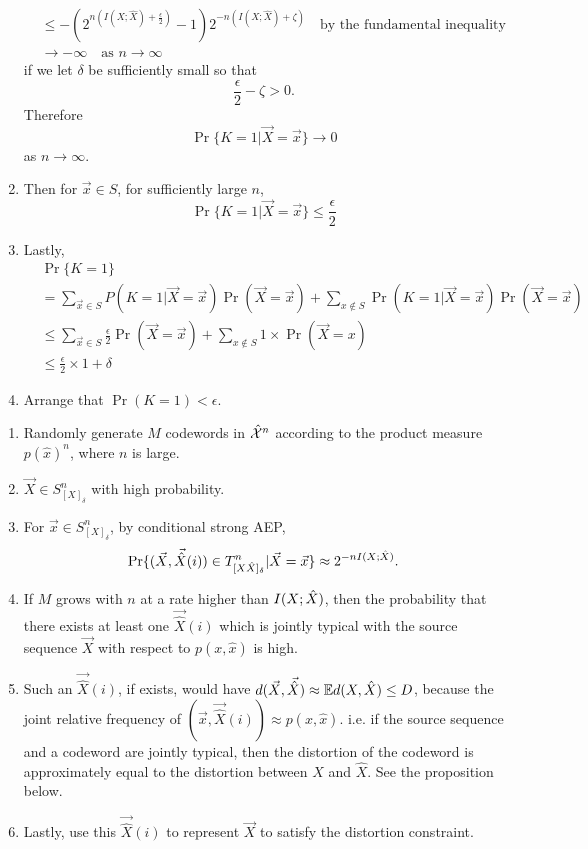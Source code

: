 \documentclass[../main.tex]{subfiles}
\begin{document}
\begin{enumerate}
\begin{align*}
       &\leq -(2^{n(I(X;\hat X)+\frac{\epsilon}{2})}-1)2^{-n(I(X;\hat X)+\zeta)} \quad\text{by the fundamental inequality}
        \\
        &\to -\infty \quad \text{as $n\to\infty$}
\end{align*}
 if we let $\delta$ be sufficiently small so that \[
 \frac{\epsilon}{2}-\zeta > 0.
 \]
 Therefore 
 \[
 \Pr\{K=1|\vec X=\vec x\}\to 0
 \] as $n\to \infty.$
 \item Then for $\vec x\in S$, for sufficiently large $n$, \[
 \Pr\{K=1|\vec X=\vec x\}\leq \frac{\epsilon}{2}
 \]
 \item Lastly,
 \begin{align*}
     &\Pr\{K=1\}\\
     &=\sum_{\vec x\in S}P(K=1|\vec X=\vec x)\Pr(\vec X=\vec x) + \sum_{x\notin S}\Pr(K=1|\vec X=\vec x) \Pr(\vec X=\vec x)\\
     &\leq \sum_{\vec x\in S}\frac{\epsilon}{2}\Pr(\vec X=\vec x) + \sum_{x\notin S}1\times \Pr(\vec X=x)\\
     &\leq \frac{\epsilon}{2}\times 1 + \delta
 \end{align*}
 \item Arrange that $\Pr(K=1) < \epsilon.$
 \end{enumerate}
\begin{enumerate}
    \item Randomly generate $M$ codewords in $\hat {\mathcal{X}}^n$ according to the product measure $p(\hat x)^n$, where $n$ is large.
    \item $\vec X\in S^n_{[X]_\delta}$ with high probability.
    \item For $\vec x\in S^n_{[X]_\delta}$, by conditional strong AEP, \[
    \Pr\{(\vec X, \vec{\hat X}(i))\in T^n_{[X\hat X]_\delta}|\vec X=\vec x\}\approx 2^{-nI(X;\hat X)}.
    \]
    \item If $M$ grows with $n$ at a rate higher than $I(X;\hat X)$, then the probability that there exists at least one $\vec{\hat X}(i)$ which is jointly typical with the source sequence $\vec X$ with respect to $p(x,\hat x)$ is high.
    \item Such an $\vec{\hat X}(i)$, if exists, would have $d(\vec X, \vec{\hat X}) \approx \mathbb{E} d(X,\hat X)\leq D$, because the joint relative frequency of $(\vec x, \vec{\hat X}(i))\approx p(x,\hat x)$. i.e. if the source sequence and a codeword are jointly typical, then the distortion of the codeword is approximately equal to the distortion between $X$ and $\hat X$. See the proposition below.
    \item Lastly, use this $\vec{\hat X}(i)$ to represent $\vec X$ to satisfy the distortion constraint.
\end{enumerate}
\end{document}
